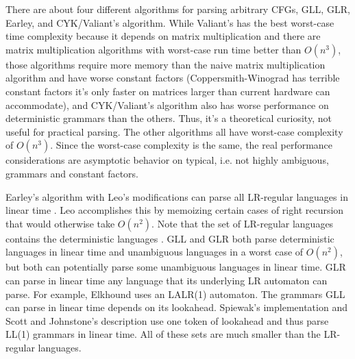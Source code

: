 \documentclass[12pt]{article}
\begin{document}

There are about four different algorithms for parsing arbitrary CFGs,
GLL, GLR, Earley, and CYK/Valiant's algorithm.  While Valiant's has
the best worst-case time complexity because it depends on matrix
multiplication and there are matrix multiplication algorithms with
worst-case run time better than $O(n^3)$, those algorithms require
more memory than the naive matrix multiplication algorithm and have
worse constant factors (Coppersmith-Winograd has terrible constant
factors it's only faster on matrices larger than current hardware can
accommodate), and CYK/Valiant's algorithm also has worse performance on
deterministic grammars than the others.  Thus, it's a theoretical
curiosity, not useful for practical parsing.  The other algorithms all
have worst-case complexity of $O(n^3)$.  Since the worst-case
complexity is the same, the real performance considerations are
asymptotic behavior on typical, i.e. not highly ambiguous, grammars
and constant factors.

Earley's algorithm with Leo's modifications can parse all LR-regular
languages in linear time \parencites{leo, marpa}.  Leo accomplishes
this by memoizing certain cases of right recursion that would
otherwise take $O(n^2)$.  Note that the set of LR-regular languages
contains the deterministic languages \parencite{lr-regular}.  GLL and
GLR both parse deterministic languages in linear time and unambiguous
languages in a worst case of $O(n^2)$, but both can potentially parse
some unambiguous languages in linear time.  GLR can parse in linear
time any language that its underlying LR automaton can parse.  For
example, Elkhound uses an LALR(1) automaton\parencite{elkhound1}.  The
grammars GLL can parse in linear time depends on its lookahead.
Spiewak's implementation\parencite{spiewak} and Scott and Johnstone's
description\parencite{gll1} use one token of lookahead and thus parse
LL(1) grammars in linear time.  All of these sets are much smaller
than the LR-regular languages.
\end{document}
